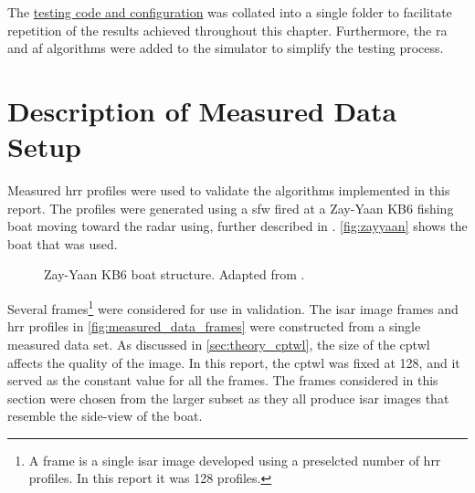 \documentclass[class=report,11pt,crop=false]{standalone}
\begin{document}
    The \href{https://github.com/tristynferreiro/QP4ISAR/tree/main/src/Simulator/Testing%20Setup}{testing code and configuration} was collated into a single folder to facilitate repetition of the results achieved throughout this chapter. Furthermore, the \gls{ra} and \gls{af} algorithms were added to the simulator to simplify the testing process.

\section{Description of Measured Data Setup} \label{subsec:measuredData_setup}
Measured \gls{hrr} profiles were used to validate the algorithms implemented in this report. The profiles were generated using a \gls{sfw} fired at a Zay-Yaan KB6 fishing boat moving toward the radar using, further described in \cite{zayyaan_data}. \autoref{fig:zayyaan} shows the boat that was used.

\begin{figure}[H]
    \centering
    \caption{Zay-Yaan KB6 boat structure. Adapted from \cite{zayyaan_data}.}
    \label{fig:zayyaan}
\end{figure}

Several frames\footnote{A frame is a single \gls{isar} image developed using a preselcted number of \gls{hrr} profiles. In this report it was 128 profiles.} were considered for use in validation. The \gls{isar} image frames and \gls{hrr} profiles in \autoref{fig:measured_data_frames} were constructed from a single measured data set. As discussed in \autoref{sec:theory_cptwl}, the size of the \gls{cptwl} affects the quality of the image. In this report, the \gls{cptwl} was fixed at 128, and it served as the constant value for all the frames. The frames considered in this section were chosen from the larger subset as they all produce \gls{isar} images that resemble the side-view of the boat. 
\end{document}
